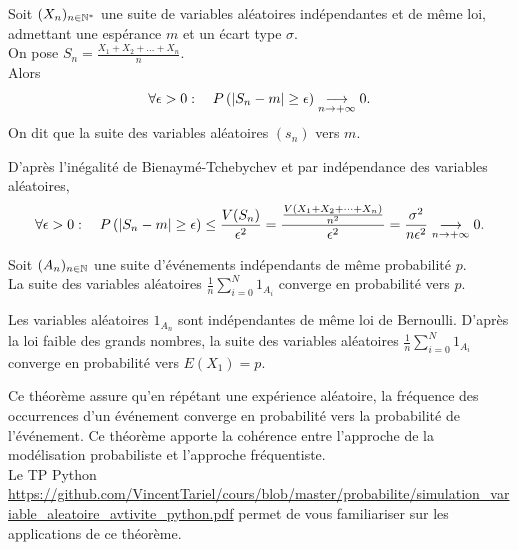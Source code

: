 \documentclass{book}
\begin{document}
\begin{Theoreme}
Soit $(X_n)_{n\in\mathbb{N}^*}$ une suite de variables aléatoires indépendantes et de même loi, admettant une espérance $m$ et un écart
type $\sigma$.\\
On pose $S_n =\frac{X_1+X_2+\dots+X_n}{n}.$\\
Alors 
$$ \forall \epsilon>0: \quad P\left(\left| S_n - m \right|\geq \epsilon \right )\tend[n\to+\infty]0.$$
On dit que la suite des variables aléatoires $(s_n)$  vers $m$. 
\end{Theoreme}
\begin{Demonstration}
D'après l'inégalité de Bienaymé-Tchebychev et par indépendance des variables aléatoires,
$$ \forall \epsilon>0: \quad P\left(\left| S_n - m \right|\geq \epsilon\right)\leq \frac{V(S_n)}{\epsilon^2}=\frac{\frac{V(X_1+X_2+\dots+X_n)}{n^2}}{\epsilon^2}=\frac{\sigma^2}{n\epsilon^2} \tend[n\to+\infty]0.$$
\end{Demonstration}


\begin{Theoreme}
Soit $(A_n)_{n\in\mathbb{N}}$ une suite 
d'événements indépendants de même probabilité $p$.\\
La suite des  
variables aléatoires $\frac 1 n \sum_{i=0}^N 1_{A_i}$ converge en probabilité vers $p$. 
\end{Theoreme}
\begin{Demonstration} Les variables aléatoires $1_{A_n}$ sont  
indépendantes de même loi de Bernoulli. D'après la loi faible des grands nombres, la suite  des  
variables aléatoires $\frac 1 n \sum_{i=0}^N 1_{A_i}$ converge en probabilité vers $E(X_1)=p$.
\end{Demonstration}
\begin{Remarque}
Ce théorème assure qu'en répétant une expérience aléatoire, la fréquence 
des occurrences d'un événement converge en probabilité  
vers la probabilité de l'événement.
Ce théorème apporte la cohérence entre l'approche de la modélisation probabiliste et  
l'approche fréquentiste.\\
Le TP Python \url{https://github.com/VincentTariel/cours/blob/master/probabilite/simulation_variable_aleatoire_avtivite_python.pdf} permet de vous familiariser sur les applications de ce théorème.
\end{Remarque}
\end{document}
